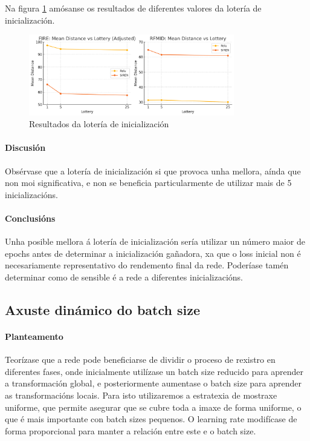 Na figura \ref{fig:lottery} amósanse os resultados de diferentes valores da lotería de inicialización.


\begin{figure}[ht]
    \centering
    \includegraphics[width=0.8\textwidth]{imaxes/lottery/lotery.png}
    \caption{Resultados da lotería de inicialización}
    \label{fig:lottery}
\end{figure}

\FloatBarrier

\paragraph{Discusión}
\label{par:Discusion-initialization}

Obsérvase que a lotería de inicialización si que provoca unha mellora, aínda que non moi significativa, e non se beneficia particularmente de utilizar mais de 5 inicializacións.

\paragraph{Conclusións}
\label{par:Conclusions-initialization}

Unha posible mellora á lotería de inicialización sería utilizar un número maior de epochs antes de determinar a inicialización gañadora, xa que o loss inicial non é necesariamente representativo do rendemento final da rede.
Poderíase tamén determinar como de sensible é a rede a diferentes inicializacións.

\subsection{Axuste dinámico do batch size}
\label{subsec:Dynamic batch size}
\paragraph{Planteamento}
\label{par:Planteamento-phases}

Teorízase que a rede pode beneficiarse de dividir o proceso de rexistro en diferentes fases, onde inicialmente utilízase un batch size reducido para aprender a transformación global, e posteriormente aumentase o batch size para aprender as transformacións locais.
Para isto utilizaremos a estratexia de mostraxe uniforme, que permite asegurar que se cubre toda a imaxe de forma uniforme, o que é mais importante con batch sizes pequenos. O learning rate modifícase de forma proporcional para manter a relación entre este e o batch size.

